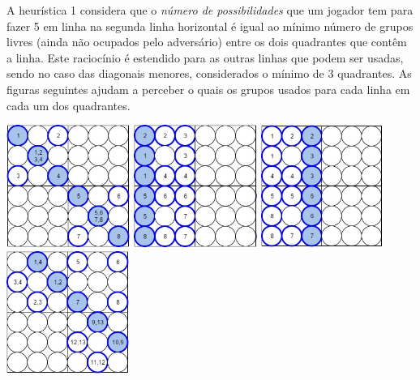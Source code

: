 A heurística 1 considera que o \emph{número de possibilidades} que um jogador tem para fazer 5 em linha na segunda linha horizontal é igual ao mínimo número de grupos livres (ainda não ocupados pelo adversário) entre os dois quadrantes que contêm a linha.
Este raciocínio é estendido para as outras linhas que podem ser usadas, sendo no caso das diagonais menores, considerados o mínimo de 3 quadrantes. As figuras seguintes ajudam a perceber o quais os grupos usados para cada linha em cada um dos quadrantes.

\begin{table}[H]
\centering
\includegraphics[height=4cm]{images/h1_pattern2.jpg}
\includegraphics[height=4cm]{images/h1_pattern3.jpg}
\includegraphics[height=4cm]{images/h1_pattern4.jpg}
\includegraphics[height=4cm]{images/h1_pattern5.jpg}
\end{table}

